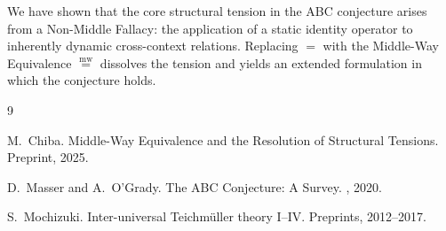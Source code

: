\documentclass[11pt]{article}
\newcommand{\mweq}{\mathrel{\overset{\mathrm{mw}}{=}}}
\begin{document}
We have shown that the core structural tension in the ABC conjecture
arises from a Non-Middle Fallacy: the application of a static identity
operator to inherently dynamic cross-context relations.
Replacing $=$ with the Middle-Way Equivalence $\mweq$ dissolves the
tension and yields an extended formulation in which the conjecture holds.


\begin{thebibliography}{9}

M.~Chiba.
\newblock Middle-Way Equivalence and the Resolution of Structural Tensions.
\newblock Preprint, 2025.

D.~Masser and A.~O'Grady.
\newblock The ABC Conjecture: A Survey.
, 2020.

S.~Mochizuki.
\newblock Inter-universal Teichmüller theory I–IV.
\newblock Preprints, 2012–2017.

\end{thebibliography}
\end{document}
